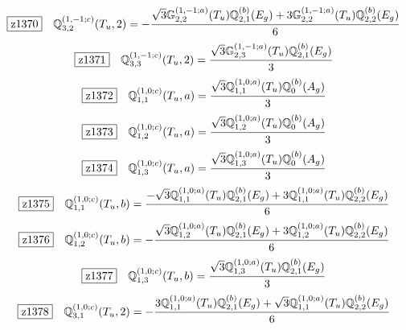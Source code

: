 \documentclass[fleqn,10pt,landscape]{jsarticle}
\begin{document}
\begin{dmath*}
\hspace*{3mm}\fbox{z1370}\quad \mathbb{Q}_{3,2}^{(1,-1;c)}(T_{u},2)=- \frac{\sqrt{3} \mathbb{G}_{2,2}^{(1,-1;a)}(T_{u}) \mathbb{Q}_{2,1}^{(b)}(E_{g}) + 3 \mathbb{G}_{2,2}^{(1,-1;a)}(T_{u}) \mathbb{Q}_{2,2}^{(b)}(E_{g})}{6}
\end{dmath*}
\begin{dmath*}
\hspace*{3mm}\fbox{z1371}\quad \mathbb{Q}_{3,3}^{(1,-1;c)}(T_{u},2)=\frac{\sqrt{3} \mathbb{G}_{2,3}^{(1,-1;a)}(T_{u}) \mathbb{Q}_{2,1}^{(b)}(E_{g})}{3}
\end{dmath*}
\begin{dmath*}
\hspace*{3mm}\fbox{z1372}\quad \mathbb{Q}_{1,1}^{(1,0;c)}(T_{u},a)=\frac{\sqrt{3} \mathbb{Q}_{1,1}^{(1,0;a)}(T_{u}) \mathbb{Q}_{0}^{(b)}(A_{g})}{3}
\end{dmath*}
\begin{dmath*}
\hspace*{3mm}\fbox{z1373}\quad \mathbb{Q}_{1,2}^{(1,0;c)}(T_{u},a)=\frac{\sqrt{3} \mathbb{Q}_{1,2}^{(1,0;a)}(T_{u}) \mathbb{Q}_{0}^{(b)}(A_{g})}{3}
\end{dmath*}
\begin{dmath*}
\hspace*{3mm}\fbox{z1374}\quad \mathbb{Q}_{1,3}^{(1,0;c)}(T_{u},a)=\frac{\sqrt{3} \mathbb{Q}_{1,3}^{(1,0;a)}(T_{u}) \mathbb{Q}_{0}^{(b)}(A_{g})}{3}
\end{dmath*}
\begin{dmath*}
\hspace*{3mm}\fbox{z1375}\quad \mathbb{Q}_{1,1}^{(1,0;c)}(T_{u},b)=\frac{- \sqrt{3} \mathbb{Q}_{1,1}^{(1,0;a)}(T_{u}) \mathbb{Q}_{2,1}^{(b)}(E_{g}) + 3 \mathbb{Q}_{1,1}^{(1,0;a)}(T_{u}) \mathbb{Q}_{2,2}^{(b)}(E_{g})}{6}
\end{dmath*}
\begin{dmath*}
\hspace*{3mm}\fbox{z1376}\quad \mathbb{Q}_{1,2}^{(1,0;c)}(T_{u},b)=- \frac{\sqrt{3} \mathbb{Q}_{1,2}^{(1,0;a)}(T_{u}) \mathbb{Q}_{2,1}^{(b)}(E_{g}) + 3 \mathbb{Q}_{1,2}^{(1,0;a)}(T_{u}) \mathbb{Q}_{2,2}^{(b)}(E_{g})}{6}
\end{dmath*}
\begin{dmath*}
\hspace*{3mm}\fbox{z1377}\quad \mathbb{Q}_{1,3}^{(1,0;c)}(T_{u},b)=\frac{\sqrt{3} \mathbb{Q}_{1,3}^{(1,0;a)}(T_{u}) \mathbb{Q}_{2,1}^{(b)}(E_{g})}{3}
\end{dmath*}
\begin{dmath*}
\hspace*{3mm}\fbox{z1378}\quad \mathbb{Q}_{3,1}^{(1,0;c)}(T_{u},2)=- \frac{3 \mathbb{Q}_{1,1}^{(1,0;a)}(T_{u}) \mathbb{Q}_{2,1}^{(b)}(E_{g}) + \sqrt{3} \mathbb{Q}_{1,1}^{(1,0;a)}(T_{u}) \mathbb{Q}_{2,2}^{(b)}(E_{g})}{6}
\end{dmath*}
\end{document}
